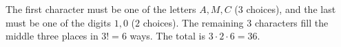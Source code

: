 The first character must be one of the letters $A,M,C$ ($3$ choices), and the last must be one of the digits $1,0$ ($2$ choices). The remaining $3$ characters fill the middle three places in $3!=6$ ways. The total is $3\cdot2\cdot6=\boxed{36}$.
